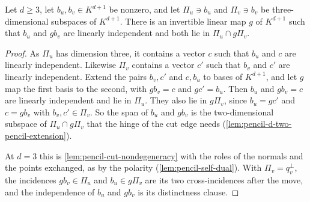 \begin{lemma}
  \label{lem:pencil-d-cut-reposition}
  \leanok
  Let $d \ge 3$, let $b_u, b_v \in K^{d+1}$ be nonzero, and let
  $\Pi_u \ni b_u$ and $\Pi_v \ni b_v$ be three-dimensional subspaces of
  $K^{d+1}$. There is an invertible linear map $g$ of $K^{d+1}$ such that
  $b_u$ and $g b_v$ are linearly independent and both lie in
  $\Pi_u \cap g\Pi_v$.
\end{lemma}
\begin{proof}
  \leanok
  As $\Pi_u$ has dimension three, it contains a vector $c$ such that
  $b_u$ and $c$ are linearly independent. Likewise $\Pi_v$ contains a
  vector $c'$ such that $b_v$ and $c'$ are linearly independent. Extend
  the pairs $b_v, c'$ and $c, b_u$ to bases of $K^{d+1}$, and let $g$
  map the first basis to the second, with $g b_v = c$ and $g c' = b_u$.
  Then $b_u$ and $g b_v = c$ are linearly independent and lie in
  $\Pi_u$. They also lie in $g\Pi_v$, since $b_u = g c'$ and
  $c = g b_v$ with $b_v, c' \in \Pi_v$. So the span of $b_u$ and
  $g b_v$ is the two-dimensional subspace of $\Pi_u \cap g\Pi_v$ that the
  hinge of the cut edge needs (\cref{lem:pencil-d-two-pencil-extension}).

  At $d = 3$ this is \cref{lem:pencil-cut-nondegeneracy} with the roles
  of the normals and the points exchanged, as by the polarity
  (\cref{lem:pencil-self-dual}). With $\Pi_v = q_v^{\perp}$, the
  incidences $g b_v \in \Pi_u$ and $b_u \in g\Pi_v$ are its two
  cross-incidences after the move, and the independence of $b_u$ and
  $g b_v$ is its distinctness clause.
\end{proof}

